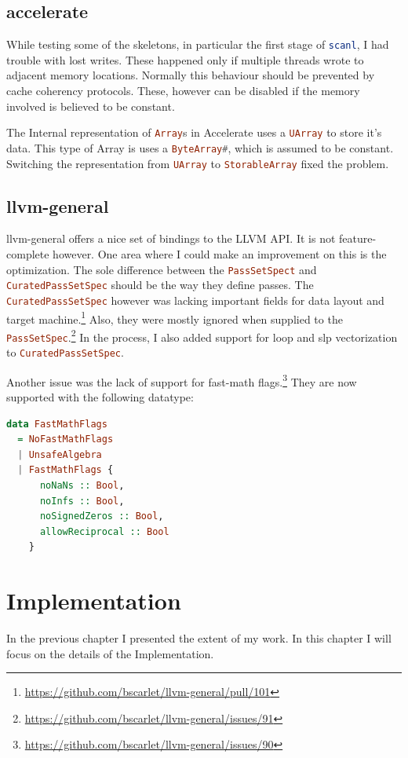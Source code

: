 \documentclass[a4paper,bibliography=totocnumbered,parskip,headsepline]{scrbook}
\begin{document}
\section{accelerate}
While testing some of the skeletons, in particular the first stage of \lstinline[language=haskell]!scanl!, I had trouble with lost writes.
These happened only if multiple threads wrote to adjacent memory locations.
Normally this behaviour should be prevented by cache coherency protocols.
These, however can be disabled if the memory involved is believed to be constant.

The Internal representation of \lstinline[language=haskell]!Array!s in Accelerate uses a \lstinline[language=haskell]!UArray! to store it's data.
This type of Array is uses a \lstinline[language=haskell]!ByteArray#!, which is assumed to be constant.
Switching the representation from \lstinline[language=haskell]!UArray! to \lstinline[language=haskell]!StorableArray! fixed the problem.

\section{llvm-general}
llvm-general offers a nice set of bindings to the LLVM API.
It is not feature-complete however.
One area where I could make an improvement on this is the optimization.
The sole difference between the \lstinline[language=haskell]!PassSetSpect! and \lstinline[language=haskell]!CuratedPassSetSpec! should be the way they define passes.
The \lstinline[language=haskell]!CuratedPassSetSpec! however was lacking important fields for data layout and target machine.\footnote{\url{https://github.com/bscarlet/llvm-general/pull/101}}
Also, they were mostly ignored when supplied to the \lstinline[language=haskell]!PassSetSpec!.\footnote{\url{https://github.com/bscarlet/llvm-general/issues/91}}
In the process, I also added support for loop and slp vectorization to \lstinline[language=haskell]!CuratedPassSetSpec!.

Another issue was the lack of support for fast-math flags.\footnote{\url{https://github.com/bscarlet/llvm-general/issues/90}}
They are now supported with the following datatype:
\begin{lstlisting}[language=haskell]
data FastMathFlags
  = NoFastMathFlags
  | UnsafeAlgebra
  | FastMathFlags {
      noNaNs :: Bool,
      noInfs :: Bool,
      noSignedZeros :: Bool,
      allowReciprocal :: Bool
    }
\end{lstlisting}

\chapter{Implementation}
In the previous chapter I presented the extent of my work.
In this chapter I will focus on the details of the Implementation.
\end{document}
